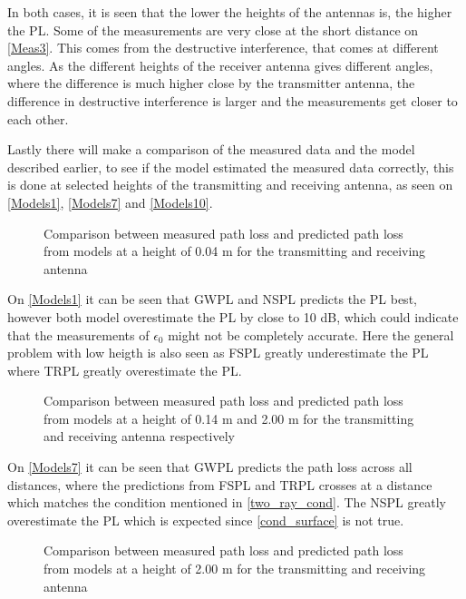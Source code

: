 In both cases, it is seen that the lower the heights of the antennas is, the higher the PL. Some of the measurements are very close at the short distance on \autoref{Meas3}. This comes from the destructive interference, that comes at different angles. As the different heights of the receiver antenna gives different angles, where the difference is much higher close by the transmitter antenna, the difference in destructive interference is larger and the measurements get closer to each other.

Lastly there will make a comparison of the measured data and the model described earlier, to see if the model estimated the measured data correctly, this is done at selected heights of the transmitting and receiving antenna, as seen on \autoref{Models1}, \autoref{Models7} and \autoref{Models10}.



\begin{figure}[H]
\centering

\caption{Comparison between measured path loss and predicted path loss from models at a height of 0.04 m for the transmitting and receiving antenna}
\label{Models1}
\end{figure}

On \autoref{Models1} it can be seen that GWPL and NSPL predicts the PL best, however both model overestimate the PL by close to 10 dB, which could indicate that the measurements of $\epsilon_0$ might not be completely accurate. Here the general problem with low heigth is also seen as FSPL greatly underestimate the PL where TRPL greatly overestimate the PL.

\begin{figure}[H]
\centering

\caption{Comparison between measured path loss and predicted path loss from models at a height of 0.14 m and 2.00 m for the transmitting and receiving antenna respectively}
\label{Models7}
\end{figure}

On \autoref{Models7} it can be seen that GWPL predicts the path loss across all distances, where the predictions from FSPL and TRPL crosses at a distance which matches the condition mentioned in \autoref{two_ray_cond}. The NSPL greatly overestimate the PL which is expected since \autoref{cond_surface} is not true.

\begin{figure}[H]
\centering

\caption{Comparison between measured path loss and predicted path loss from models at a height of 2.00 m for the transmitting and receiving antenna}
\label{Models10}
\end{figure}

